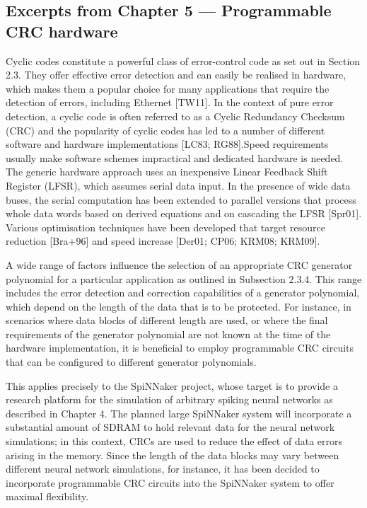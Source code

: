 \documentclass[a4paper, 11pt]{article}
\begin{document}
\newpage
\subsection{Excerpts from Chapter 5 --- Programmable CRC hardware}
Cyclic codes constitute a powerful class of error-control code as set out in Section 2.3. They offer effective error detection and can easily be realised in hardware, which makes them a popular choice for many applications that require the detection of errors, including Ethernet [TW11]. In the context of pure error detection, a cyclic code is often referred to as a Cyclic Redundancy Checksum (CRC) and the popularity of cyclic codes has led to a number of different software and hardware implementations [LC83; RG88].Speed requirements usually make software schemes impractical and dedicated hardware is needed. The generic hardware approach uses an inexpensive Linear Feedback Shift Register (LFSR), which assumes serial data input. In the presence of wide data buses, the serial computation has been extended to parallel versions that process whole data words based on derived equations and on cascading the LFSR [Spr01]. Various optimisation techniques have been developed that target resource reduction [Bra+96] and speed increase [Der01; CP06; KRM08; KRM09].

A wide range of factors influence the selection of an appropriate CRC generator polynomial for a particular application as outlined in Subsection 2.3.4. This range includes the error detection and correction capabilities of a generator polynomial, which depend on the length of the data that is to be protected. For instance, in scenarios where data blocks of different length are used, or where the final requirements of the generator polynomial are not known at the time of the hardware implementation, it is beneficial to employ programmable CRC circuits that can be configured to different generator polynomials.

This applies precisely to the SpiNNaker project, whose target is to provide a research platform for the simulation of arbitrary spiking neural networks as described in Chapter 4. The planned large SpiNNaker system will incorporate a substantial amount of SDRAM to hold relevant data for the neural network simulations; in this context, CRCs are used to reduce the effect of data errors arising in the memory. Since the length of the data blocks may vary between different neural network simulations, for instance, it has been decided to incorporate programmable CRC circuits into the SpiNNaker system to offer maximal flexibility.
\end{document}
